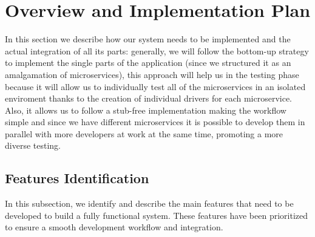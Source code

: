 \section{Overview and Implementation Plan}
In this section we describe how our system needs to be implemented and the actual integration of all its parts: generally, we will follow the bottom-up strategy to implement the single parts of the application (since we structured it as an amalgamation of microservices), this approach will help us in the testing phase because it will allow us to individually test all of the microservices in an isolated enviroment thanks to the creation of individual drivers for each microservice. Also, it allows us to follow a stub-free implementation making the workflow simple and since we have different microservices it is possible to develop them in parallel with more developers at work at the same time, promoting a more diverse testing.

\subsection{Features Identification}

In this subsection, we identify and describe the main features that need to be developed to build a fully functional system. These features have been prioritized to ensure a smooth development workflow and integration.

